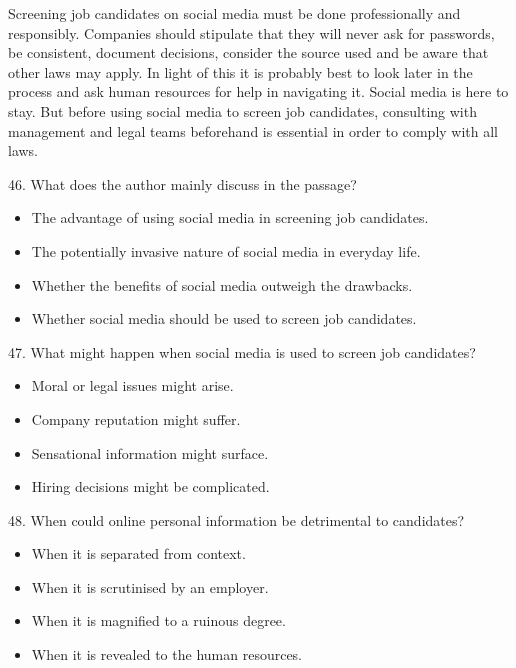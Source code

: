 \documentclass[UTF8,11pt]{ctexart}
\begin{document}
Screening job candidates on social media must be done professionally and responsibly. Companies should stipulate that they will never ask for passwords, be consistent, document decisions, consider the source used and be aware that other laws may apply. In light of this it is probably best to look later in the process and ask human resources for help in navigating it. Social media is here to stay. But before using social media to screen job candidates, consulting with management and legal teams beforehand is essential in order to comply with all laws.


46. What does the author mainly discuss in the passage?


\begin{itemize}[leftmargin=2em,itemsep=.2em,topsep=.4em]\item[A.] The advantage of using social media in screening job candidates.
\item[B.] The potentially invasive nature of social media in everyday life.
\item[C.] Whether the benefits of social media outweigh the drawbacks.
\item[D.] Whether social media should be used to screen job candidates.
\end{itemize}

47. What might happen when social media is used to screen job candidates?


\begin{itemize}[leftmargin=2em,itemsep=.2em,topsep=.4em]\item[A.] Moral or legal issues might arise.
\item[B.] Company reputation might suffer.
\item[C.] Sensational information might surface.
\item[D.] Hiring decisions might be complicated.
\end{itemize}

48. When could online personal information be detrimental to candidates?


\begin{itemize}[leftmargin=2em,itemsep=.2em,topsep=.4em]\item[A.] When it is separated from context.
\item[B.] When it is scrutinised by an employer.
\item[C.] When it is magnified to a ruinous degree.
\item[D.] When it is revealed to the human resources.
\end{itemize}
\end{document}
